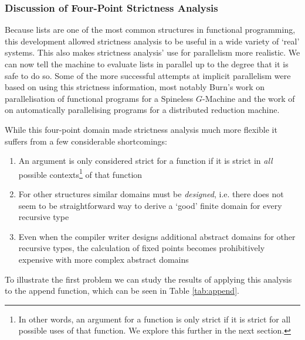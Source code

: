 \subsubsection{Discussion of Four-Point Strictness Analysis}

Because lists are one of the most common structures in functional programming,
this development allowed strictness analysis to be useful in a wide variety of
`real' systems. This also makes strictness analysis' use for parallelism more
realistic. We can now tell the machine to evaluate lists in parallel up to the
degree that it is safe to do so. Some of the more successful attempts at
implicit parallelism were based on using this strictness information, most
notably Burn's work on parallelisation of functional programs for a Spineless
$G$-Machine \citep{burn1987evaluation} and the work of
\citet{hogen1992automatic} on automatically parallelising programs for a
distributed reduction machine.

While this four-point domain made strictness analysis much more flexible it
suffers from a few considerable shortcomings:

\begin{enumerate}
    \item An argument is only considered strict for a function if it is strict
        in \emph{all} possible contexts\footnote{In other words, an argument
                for a function is only strict if it is strict for all possible
                uses of that function. We explore this further in the next
                section.} of that function
    \item For other structures similar domains must be \emph{designed}, i.e.
        there does not seem to be straightforward way to derive a `good' finite
        domain for every recursive type
    \item Even when the compiler writer designs additional abstract domains
        for other recursive types, the calculation of fixed points becomes
        prohibitively expensive with more complex abstract domains
\end{enumerate}

To illustrate the first problem we can study the results of applying this
analysis to the \<append\> function, which can be seen in Table
\ref{tab:append}.

